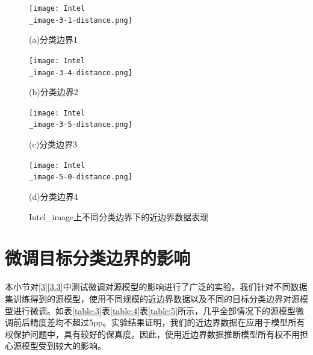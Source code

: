 \begin{figure}[htbp]%
	\centering
	\begin{minipage}[htbp]{0.49\linewidth}        %
		\hspace{2mm}
		\centering
		\texttt{[image: Intel\\\_image-3-1-distance.png]}
		\centerline{(a)分类边界1}
	\end{minipage}
	\begin{minipage}[htbp]{0.49\linewidth}        %
		\hspace{2mm}
		\centering
		\texttt{[image: Intel\\\_image-3-4-distance.png]}
		\centerline{(b)分类边界2}
	\end{minipage}
	\begin{minipage}[htbp]{0.49\linewidth}        %
		\hspace{2mm}
		\centering
		\texttt{[image: Intel\\\_image-3-5-distance.png]}
		\centerline{(c)分类边界3}
	\end{minipage}
	\begin{minipage}[htbp]{0.49\linewidth}        %
		\hspace{2mm}
		\centering
		\texttt{[image: Intel\\\_image-5-0-distance.png]}
		\centerline{(d)分类边界4}
	\end{minipage}
\setlength{\abovecaptionskip}{7mm} %
\caption{Intel\_image上不同分类边界下的近边界数据表现}
\label{Intel-image上不同分类边界下的近边界数据表现}
\end {figure}


\section{微调目标分类边界的影响}\label{5.4}

本小节对\ref{3}\ref{3.3}中测试微调对源模型的影响进行了广泛的实验。我们针对不同数据集训练得到的源模型，使用不同规模的近边界数据以及不同的目标分类边界对源模型进行微调。如表\ref{table:3}表\ref{table:4}表\ref{table:5}所示，几乎全部情况下的源模型微调前后精度差均不超过5pp。实验结果证明，我们的近边界数据在应用于模型所有权保护问题中，具有较好的保真度。因此，使用近边界数据推断模型所有权不用担心源模型受到较大的影响。


